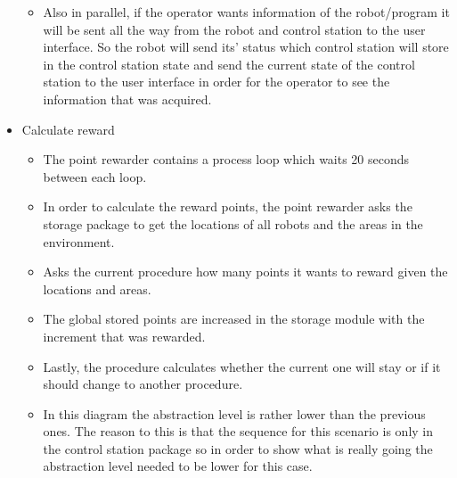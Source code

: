 \begin{itemize}
\begin{itemize}
           \item Also in parallel, if the operator wants information of the robot/program it will be sent all the way from the robot and control station to the user interface. So the robot will send its' status which control station will store in the control station state and send the current state of the control station to the user interface in order for the operator to see the information that was acquired.   
       \end{itemize}
    \item Calculate reward
       \begin{itemize}
           \item The point rewarder contains a process loop which waits 20 seconds between each loop.
           \item In order to calculate the reward points, the point rewarder asks the storage package to get the locations of all robots and the areas in the environment.
           \item Asks the current procedure how many points it wants to reward given the locations and areas.
           \item The global stored points are increased in the storage module with the increment that was rewarded.
           \item Lastly, the procedure calculates whether the current one will stay or if it should change to another procedure.
           \item In this diagram the abstraction level is rather lower than the previous ones. The reason to this is that the sequence for this scenario is only in the control station package so in order to show what is really going the abstraction level needed to be lower for this case.
       \end{itemize}
\end{itemize}